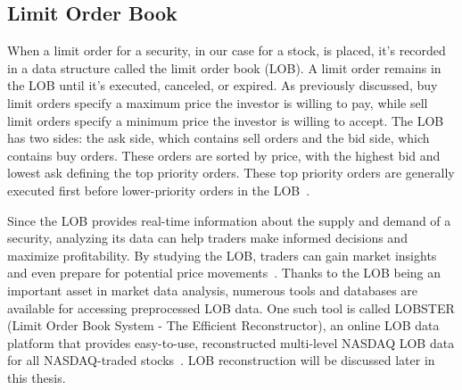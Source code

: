 \documentclass[a4paper,oneside,onecolumn,12pt]{book}
\begin{document}
	\subsection{Limit Order Book}
	When a limit order for a security, in our case for a stock, is placed, it's recorded in a data structure called the limit order book (LOB). A limit order remains in the LOB until it's executed, canceled, or expired. As previously discussed, buy limit orders specify a maximum price the investor is willing to pay, while sell limit orders specify a minimum price the investor is willing to accept. The LOB has two sides: the ask side, which contains sell orders and the bid side, which contains buy orders. These orders are sorted by price, with the highest bid and lowest ask defining the top priority orders. These top priority orders are generally executed first before lower-priority orders in the LOB~\cite{WLOBDD}.

	Since the LOB provides real-time information about the supply and demand of a security, analyzing its data can help traders make informed decisions and maximize profitability. By studying the LOB, traders can gain market insights and even prepare for potential price movements~\cite{PIMPILOB}. Thanks to the LOB being an important asset in market data analysis, numerous tools and databases are available for accessing preprocessed LOB data. One such tool is called LOBSTER (Limit Order Book System - The Efficient Reconstructor), an online LOB data platform that provides easy-to-use, reconstructed multi-level NASDAQ LOB data for all NASDAQ-traded stocks~\cite{WLOBSTER}. LOB reconstruction will be discussed later in this thesis.
\end{document}
